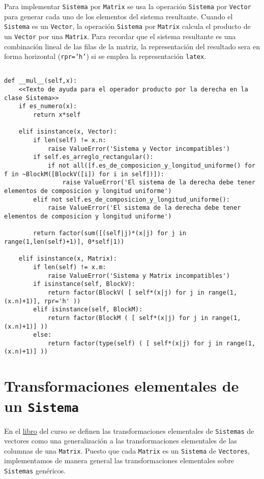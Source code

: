 \documentclass[11pt]{report}
\begin{document}
Para implementar \texttt{Sistema} por \texttt{Matrix} se usa la operación \texttt{Sistema}
por \texttt{Vector} para generar cada uno de los elementos del sistema
resultante. Cuando el \texttt{Sistema} es un \texttt{Vector}, la operación \texttt{Sistema}
por \texttt{Matrix} calcula el producto de un \texttt{Vector} por una \texttt{Matrix}. Para
recordar que el sistema resultante es una combinación lineal de las
filas de la matriz, la representación del resultado sera en forma
horizontal (\texttt{rpr='h'}) si se emplea la representación \texttt{latex}.

\begin{verbatim}

def __mul__(self,x):
    <<Texto de ayuda para el operador producto por la derecha en la clase Sistema>>
    if es_numero(x):
        return x*self

    elif isinstance(x, Vector):
        if len(self) != x.n:
            raise ValueError('Sistema y Vector incompatibles')
        if self.es_arreglo_rectangular():
            if not all([f.es_de_composicion_y_longitud_uniforme() for f in ~BlockM([BlockV([i]) for i in self])]):
                raise ValueError('El sistema de la derecha debe tener elementos de composicion y longitud uniforme')
        elif not self.es_de_composicion_y_longitud_uniforme():
            raise ValueError('El sistema de la derecha debe tener elementos de composicion y longitud uniforme')
            
        return factor(sum([(self|j)*(x|j) for j in range(1,len(self)+1)], 0*self|1))
    
    elif isinstance(x, Matrix):
        if len(self) != x.m:
            raise ValueError('Sistema y Matrix incompatibles')
        if isinstance(self, BlockV):
            return factor(BlockV( [ self*(x|j) for j in range(1,(x.n)+1)], rpr='h' ))
        elif isinstance(self, BlockM):
            return factor(BlockM ( [ self*(x|j) for j in range(1,(x.n)+1)] ))
        else:
            return factor(type(self) ( [ self*(x|j) for j in range(1,(x.n)+1)] ))

\end{verbatim}

\section{Transformaciones elementales de un \texttt{Sistema}}
\label{sec:org66693a3}

En el \href{https://mbujosab.github.io/CursoDeAlgebraLineal/libro.pdf\#section.9.3}{libro} del curso se definen las transformaciones elementales de
\texttt{Sistemas} de vectores como una generalización a las transformaciones
elementales de las columnas de una \texttt{Matrix}. Puesto que cada \texttt{Matrix}
es un \texttt{Sistema} de \texttt{Vectores}, implementamos de manera general las
transformaciones elementales sobre \texttt{Sistemas} genéricos.
\end{document}
